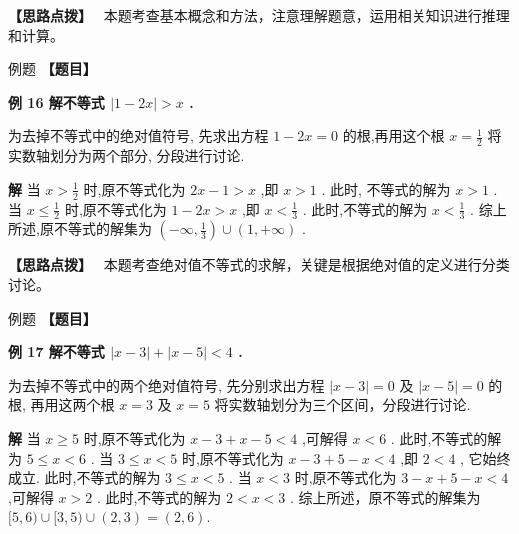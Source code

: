 \documentclass[a4paper,10pt,oneside,fontset=none]{ctexbook}
\renewcommand{\geq}{\geqslant}
\renewcommand{\leq}{\leqslant}
\newcounter{example}[chapter]
\newenvironment{example}[1][]{\begin{exBox}{例题}{#1}}{\end{exBox}}
\numberwithin{equation}{chapter}
\newenvironment{solution}{\begin{solutionBox}}{\end{solutionBox}}
\newenvironment{hint}{\begin{hintBox}\textbf{【思路点拨】}~}{\end{hintBox}}
\begin{document}
\begin{hint}
本题考查基本概念和方法，注意理解题意，运用相关知识进行推理和计算。
\end{hint}

\begin{example}
\textbf{【题目】}\par\vspace{0.3em}
\textbf{例 16 解不等式 $\left| {1 - {2x}}\right|  > x$ .}\par\vspace{0.3em}
为去掉不等式中的绝对值符号, 先求出方程 $1 - {2x} = 0$ 的根,再用这个根 $x = \frac{1}{2}$ 将实数轴划分为两个部分, 分段进行讨论.
\end{example}

\begin{solution}
\textbf{解}
当 $x > \frac{1}{2}$ 时,原不等式化为 ${2x} - 1 > x$ ,即 $x > 1$ . 此时, 不等式的解为 $x > 1$ .
当 $x \leq  \frac{1}{2}$ 时,原不等式化为 $1 - {2x} > x$ ,即 $x < \frac{1}{3}$ . 此时,不等式的解为 $x < \frac{1}{3}$ .
综上所述,原不等式的解集为 $\left( {-\infty ,\frac{1}{3}}\right)  \cup  \left( {1, + \infty }\right)$ .
\end{solution}

\begin{hint}
本题考查绝对值不等式的求解，关键是根据绝对值的定义进行分类讨论。
\end{hint}

\begin{example}
\textbf{【题目】}\par\vspace{0.3em}
\textbf{例 17 解不等式 $\left| {x - 3}\right|  + \left| {x - 5}\right|  < 4$ .}\par\vspace{0.3em}
为去掉不等式中的两个绝对值符号, 先分别求出方程 $\left| {x - 3}\right|  = 0$ 及 $\left| {x - 5}\right|  = 0$ 的根, 再用这两个根 $x = 3$ 及 $x = 5$ 将实数轴划分为三个区间，分段进行讨论.
\end{example}

\begin{solution}
\textbf{解}
当 $x \geq  5$ 时,原不等式化为 $x - 3 + x - 5 < 4$ ,可解得 $x < 6$ . 此时,不等式的解为 $5 \leq  x < 6$ .
当 $3 \leq  x < 5$ 时,原不等式化为 $x - 3 + 5 - x < 4$ ,即 $2 < 4$ , 它始终成立. 此时,不等式的解为 $3 \leq  x < 5$ .
当 $x < 3$ 时,原不等式化为 $3 - x + 5 - x < 4$ ,可解得 $x > 2$ . 此时,不等式的解为 $2 < x < 3$ .
综上所述，原不等式的解集为 $\lbrack 5,6) \cup  \lbrack 3,5) \cup  \left( {2,3}\right)  = \left( {2,6}\right) .$
\end{solution}
\end{document}
